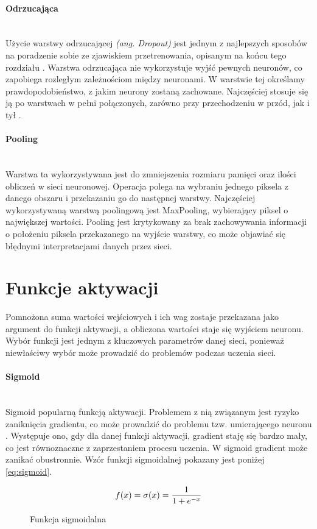 \paragraph{Odrzucająca} \mbox{}\\
Użycie warstwy odrzucającej \textit{(ang. Dropout)} jest jednym z najlepszych sposobów
na poradzenie sobie ze zjawiskiem przetrenowania, opisanym na końcu tego rozdziału
\cite{DropoutPreventOverfit}. Warstwa odrzucająca nie wykorzystuje wyjść pewnych neuronów,
co zapobiega rozległym zależnościom między neuronami. W warstwie tej określamy prawdopodobieństwo,
z jakim neurony zostaną zachowane. Najczęściej stosuje się ją po warstwach w pełni
połączonych, zarówno przy przechodzeniu w przód, jak i tył \cite{DropConnect}.

\paragraph{Pooling} \mbox{}\\
Warstwa ta wykorzystywana jest do zmniejszenia rozmiaru pamięci oraz ilości obliczeń
w sieci neuronowej. Operacja polega na wybraniu jednego piksela z danego obszaru i przekazaniu
go do następnej warstwy. Najczęściej wykorzystywaną warstwą poolingową jest MaxPooling, wybierający
piksel o największej wartości. Pooling jest krytykowany za brak zachowywania informacji
o położeniu piksela przekazanego na wyjście warstwy, co może objawiać się błędnymi
interpretacjami danych przez sieci.

\section{Funkcje aktywacji}

Pomnożona suma wartości wejściowych i ich wag zostaje przekazana
jako argument do funkcji aktywacji, a obliczona wartości staje się wyjściem neuronu.
Wybór funkcji jest jednym z kluczowych parametrów danej sieci, ponieważ niewłaściwy wybór
może prowadzić do problemów podczas uczenia sieci.

\paragraph{Sigmoid} \mbox{}\\
Sigmoid popularną funkcją aktywacji. Problemem z nią związanym
jest ryzyko zaniknięcia gradientu, co może prowadzić do problemu tzw. umierającego
neuronu \cite{activationFunctions}. Występuje ono, gdy dla danej funkcji aktywacji,
gradient staję się bardzo mały, co jest równoznaczne z zaprzestaniem procesu uczenia.
W sigmoid gradient może zanikać obustronnie. Wzór funkcji sigmoidalnej pokazany jest poniżej \ref{eq:sigmoid}.
\begin{figure}[h!]
\renewcommand{\figurename}{Wzór}%
\begin{equation} \label{eq:sigmoid}
f(x) = \sigma(x) = \frac{1}{1 + e^{-x}} \\
\end{equation}
\caption{Funkcja sigmoidalna}
\end{figure}


